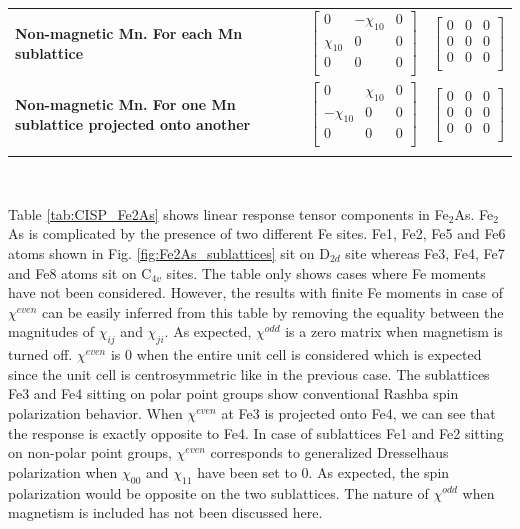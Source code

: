 \documentclass[letterpaper,10pt,doublespacing,edeposit]{uiucthesis2020}
\begin{document}
\begin{mainmatter}
\begin{table}
\begin{tabular}{>{\raggedright\arraybackslash}p{7cm}>{\centering\arraybackslash}p{3.5cm}>{\centering\arraybackslash}p{3.5cm}}
\addlinespace[1.5ex]
\hline
\addlinespace[1.5ex]
\textbf{Non-magnetic Mn. For each Mn sublattice} & $\begin{bmatrix} 0 & -\chi_{10} & 0\\ \chi_{10} & 0 & 0\\  0 & 0 & 0\\ \end{bmatrix}$ & $\begin{bmatrix} 0 & 0 & 0\\ 0 & 0 & 0\\ 0 & 0 & 0\\ \end{bmatrix}$\\
\addlinespace[1.5ex]
\hline
\addlinespace[1.5ex]
\textbf{Non-magnetic Mn. For one Mn sublattice projected onto another} & $\begin{bmatrix} 0 & \chi_{10} & 0\\ -\chi_{10} & 0 & 0\\  0 & 0 & 0\\ \end{bmatrix}$ & $\begin{bmatrix} 0 & 0 & 0\\ 0 & 0 & 0\\ 0 & 0 & 0\\ \end{bmatrix}$\\
\addlinespace[1.5ex]
\hline\hline
\end{tabular}
~\\
\end{table}

Table \ref{tab:CISP_Fe2As} shows linear response tensor components in Fe$_2$As. Fe$_2$As is complicated by the presence of two different Fe sites. Fe1, Fe2, Fe5 and Fe6 atoms shown in Fig. \ref{fig:Fe2As_sublattices} sit on D$_{2d}$ site whereas Fe3, Fe4, Fe7 and Fe8 atoms sit on C$_{4v}$ sites. The table only shows cases where Fe moments have not been considered. However, the results with finite Fe moments in case of $\chi^{even}$ can be easily inferred from this table by removing the equality between the magnitudes of $\chi_{ij}$ and $\chi_{ji}$. As expected, $\chi^{odd}$ is a zero matrix when magnetism is turned off. $\chi^{even}$ is 0 when the entire unit cell is considered which is expected since the unit cell is centrosymmetric like in the previous case. The sublattices Fe3 and Fe4 sitting on polar point groups show conventional Rashba spin polarization behavior. When $\chi^{even}$ at Fe3 is projected onto Fe4, we can see that the response is exactly opposite to Fe4. In case of sublattices Fe1 and Fe2 sitting on non-polar point groups, $\chi^{even}$ corresponds to generalized Dresselhaus polarization when $\chi_{00}$ and $\chi_{11}$ have been set to 0. As expected, the spin polarization would be opposite on the two sublattices. The nature of $\chi^{odd}$ when magnetism is included has not been discussed here.




\end{mainmatter}
\end{document}
